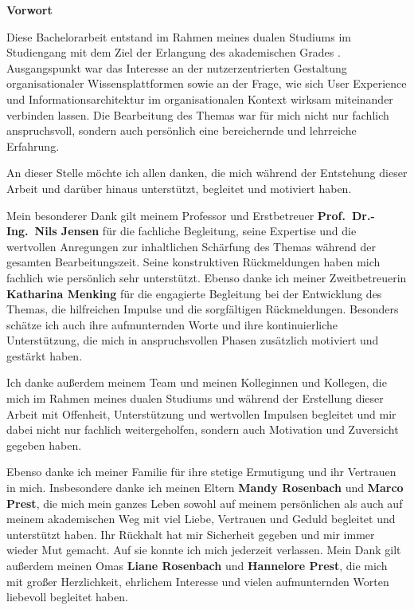 \clearpage

{\LARGE\textbf{Vorwort}}
\vspace{1em}

\itshape

Diese Bachelorarbeit entstand im Rahmen meines dualen Studiums im Studiengang \studies\space mit dem Ziel der Erlangung des akademischen Grades \degree. Ausgangspunkt war das Interesse an der nutzerzentrierten Gestaltung organisationaler Wissensplattformen sowie an der Frage, wie sich User Experience und Informationsarchitektur im organisationalen Kontext wirksam miteinander verbinden lassen. Die Bearbeitung des Themas war für mich nicht nur fachlich anspruchsvoll, sondern auch persönlich eine bereichernde und lehrreiche Erfahrung.

An dieser Stelle möchte ich allen danken, die mich während der Entstehung dieser Arbeit und darüber hinaus unterstützt, begleitet und motiviert haben.

Mein besonderer Dank gilt meinem Professor und Erstbetreuer \textbf{Prof.\ Dr.-Ing.\ Nils Jensen} für die fachliche Begleitung, seine Expertise und die wertvollen Anregungen zur inhaltlichen Schärfung des Themas während der gesamten Bearbeitungszeit. Seine konstruktiven Rückmeldungen haben mich fachlich wie persönlich sehr unterstützt.
Ebenso danke ich meiner Zweitbetreuerin \textbf{Katharina Menking} für die engagierte Begleitung bei der Entwicklung des Themas, die hilfreichen Impulse und die sorgfältigen Rückmeldungen. Besonders schätze ich auch ihre aufmunternden Worte und ihre kontinuierliche Unterstützung, die mich in anspruchsvollen Phasen zusätzlich motiviert und gestärkt haben.

Ich danke außerdem meinem Team und meinen Kolleginnen und Kollegen, die mich im Rahmen meines dualen Studiums und während der Erstellung dieser Arbeit mit Offenheit, Unterstützung und wertvollen Impulsen begleitet und mir dabei nicht nur fachlich weitergeholfen, sondern auch Motivation und Zuversicht gegeben haben.

Ebenso danke ich meiner Familie für ihre stetige Ermutigung und ihr Vertrauen in mich. Insbesondere danke ich meinen Eltern \textbf{Mandy Rosenbach} und \textbf{Marco Prest}, die mich mein ganzes Leben sowohl auf meinem persönlichen als auch auf meinem akademischen Weg mit viel Liebe, Vertrauen und Geduld begleitet und unterstützt haben. Ihr Rückhalt hat mir Sicherheit gegeben und mir immer wieder Mut gemacht. Auf sie konnte ich mich jederzeit verlassen.
Mein Dank gilt außerdem meinen Omas \textbf{Liane Rosenbach} und \textbf{Hannelore Prest}, die mich mit großer Herzlichkeit, ehrlichem Interesse und vielen aufmunternden Worten liebevoll begleitet haben.

